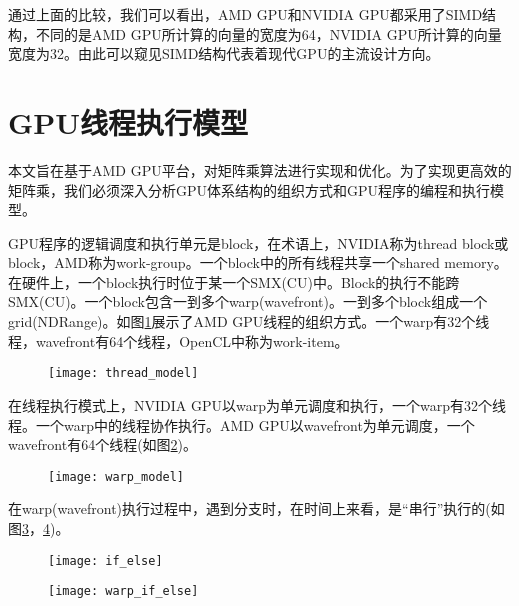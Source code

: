 通过上面的比较，我们可以看出，AMD GPU和NVIDIA GPU都采用了SIMD结构，不同的是AMD GPU所计算的向量的宽度为64，NVIDIA GPU所计算的向量宽度为32。由此可以窥见SIMD结构代表着现代GPU的主流设计方向。




\section{GPU线程执行模型}
本文旨在基于AMD GPU平台，对矩阵乘算法进行实现和优化。为了实现更高效的矩阵乘，我们必须深入分析GPU体系结构的组织方式和GPU程序的编程和执行模型。

GPU程序的逻辑调度和执行单元是block，在术语上，NVIDIA称为thread block或block，AMD称为work-group。一个block中的所有线程共享一个shared memory。在硬件上，一个block执行时位于某一个SMX(CU)中。Block的执行不能跨SMX(CU)。一个block包含一到多个warp(wavefront)。一到多个block组成一个grid(NDRange)。如图\ref{fig:thread_model}展示了AMD GPU线程的组织方式。一个warp有32个线程，wavefront有64个线程，OpenCL中称为work-item。

\begin{figure}[htbp]
	\centering
	\texttt{[image: thread\_model]}
	\label{fig:thread_model}
\end{figure}

在线程执行模式上，NVIDIA GPU以warp为单元调度和执行，一个warp有32个线程。一个warp中的线程协作执行。AMD GPU以wavefront为单元调度，一个wavefront有64个线程(如图\ref{fig:warp_model})。

\begin{figure}[htbp]
	\centering
	\texttt{[image: warp\_model]}
	\label{fig:warp_model}
\end{figure}

在warp(wavefront)执行过程中，遇到分支时，在时间上来看，是“串行”执行的(如图\ref{fig:if_else}，\ref{fig:warp_if_else})。

\begin{figure}[htbp]
	\centering
	\texttt{[image: if\_else]}
	\label{fig:if_else}
\end{figure}

\begin{figure}[htbp]
	\centering
	\texttt{[image: warp\_if\_else]}
	\label{fig:warp_if_else}
\end{figure}

